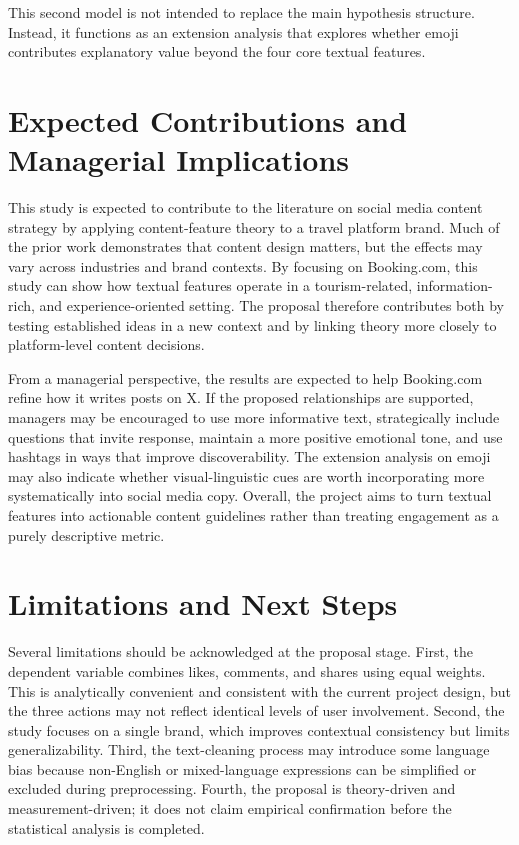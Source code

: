 \documentclass[12pt,a4paper]{ctexart}
\begin{document}
This second model is not intended to replace the main hypothesis structure. Instead, it functions as an extension analysis that explores whether emoji contributes explanatory value beyond the four core textual features.

\section{Expected Contributions and Managerial Implications}
This study is expected to contribute to the literature on social media content strategy by applying content-feature theory to a travel platform brand. Much of the prior work demonstrates that content design matters, but the effects may vary across industries and brand contexts. By focusing on Booking.com, this study can show how textual features operate in a tourism-related, information-rich, and experience-oriented setting. The proposal therefore contributes both by testing established ideas in a new context and by linking theory more closely to platform-level content decisions.

From a managerial perspective, the results are expected to help Booking.com refine how it writes posts on X. If the proposed relationships are supported, managers may be encouraged to use more informative text, strategically include questions that invite response, maintain a more positive emotional tone, and use hashtags in ways that improve discoverability. The extension analysis on emoji may also indicate whether visual-linguistic cues are worth incorporating more systematically into social media copy. Overall, the project aims to turn textual features into actionable content guidelines rather than treating engagement as a purely descriptive metric.

\section{Limitations and Next Steps}
Several limitations should be acknowledged at the proposal stage. First, the dependent variable combines likes, comments, and shares using equal weights. This is analytically convenient and consistent with the current project design, but the three actions may not reflect identical levels of user involvement. Second, the study focuses on a single brand, which improves contextual consistency but limits generalizability. Third, the text-cleaning process may introduce some language bias because non-English or mixed-language expressions can be simplified or excluded during preprocessing. Fourth, the proposal is theory-driven and measurement-driven; it does not claim empirical confirmation before the statistical analysis is completed.
\end{document}
